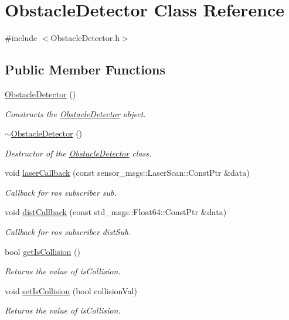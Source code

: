 \hypertarget{class_obstacle_detector}{}\section{Obstacle\+Detector Class Reference}
\label{class_obstacle_detector}


{\ttfamily \#include $<$Obstacle\+Detector.\+h$>$}

\subsection*{Public Member Functions}
\begin{DoxyCompactItemize}
\item 
\hyperlink{class_obstacle_detector_ae97e1085c7f6a3418faa1295c81d0b87}{Obstacle\+Detector} ()
\begin{DoxyCompactList}\small\item\em Constructs the \hyperlink{class_obstacle_detector}{Obstacle\+Detector} object. \end{DoxyCompactList}\item 
\hyperlink{class_obstacle_detector_aa3b42649fc5c973f677a4aba968d25cc}{$\sim$\+Obstacle\+Detector} ()
\begin{DoxyCompactList}\small\item\em Destructor of the \hyperlink{class_obstacle_detector}{Obstacle\+Detector} class. \end{DoxyCompactList}\item 
void \hyperlink{class_obstacle_detector_adac40fe27cffd6e331d1e97e7b6ca24b}{laser\+Callback} (const sensor\+\_\+msgs\+::\+Laser\+Scan\+::\+Const\+Ptr \&data)
\begin{DoxyCompactList}\small\item\em Callback for ros subscriber sub. \end{DoxyCompactList}\item 
void \hyperlink{class_obstacle_detector_af30f1b30086872b68b446e54052534b2}{dist\+Callback} (const std\+\_\+msgs\+::\+Float64\+::\+Const\+Ptr \&data)
\begin{DoxyCompactList}\small\item\em Callback for ros subscriber dist\+Sub. \end{DoxyCompactList}\item 
bool \hyperlink{class_obstacle_detector_aede4ced75212e4c1f57ded5ebb0db52d}{get\+Is\+Collision} ()
\begin{DoxyCompactList}\small\item\em Returns the value of is\+Collision. \end{DoxyCompactList}\item 
void \hyperlink{class_obstacle_detector_affe63dc23f2365c719f788689798598d}{set\+Is\+Collision} (bool collision\+Val)
\begin{DoxyCompactList}\small\item\em Returns the value of is\+Collision. \end{DoxyCompactList}\end{DoxyCompactItemize}


